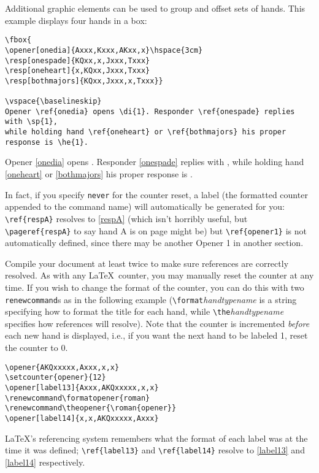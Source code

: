 \documentclass[10pt]{article}%
\newcommand{\gap}{\vspace{\baselineskip}}
\begin{document}
Additional graphic elements can be used to group and offset sets of hands. This example displays four hands in a box:

\begin{verbatim}
\fbox{
\opener[onedia]{Axxx,Kxxx,AKxx,x}\hspace{3cm}
\resp[onespade]{KQxx,x,Jxxx,Txxx}
\resp[oneheart]{x,KQxx,Jxxx,Txxx}
\resp[bothmajors]{KQxx,Jxxx,x,Txxx}}

\vspace{\baselineskip}
Opener \ref{onedia} opens \di{1}. Responder \ref{onespade} replies with \sp{1}, 
while holding hand \ref{oneheart} or \ref{bothmajors} his proper response is \he{1}.
\end{verbatim}


\gap Opener \ref{onedia} opens . Responder \ref{onespade} replies with , while holding hand \ref{oneheart} or \ref{bothmajors} his proper response is .

\gap In fact, if you specify \verb+never+ for the counter reset, a label (the formatted counter appended to the command name) will automatically be generated for you: \verb+\ref{respA}+ resolves to \ref{respA} (which isn't horribly useful, but \verb+\pageref{respA}+ to say hand A is on page \pageref{respA} might be) but \verb+\ref{opener1}+ is not automatically defined, since there may be another Opener 1 in another section.

Compile your document at least twice to make sure references are correctly resolved. As with any \LaTeX\ counter, you may manually reset the counter at any time. If you wish to change the format of the counter, you can do this with two \verb+renewcommand+s as in the following example (\verb+\format+\textit{handtypename} is a string specifying how to format the title for each hand, while \verb+\the+\textit{handtypename} specifies how references will resolve). Note that the counter is incremented \textit{before} each new hand is displayed, i.e., if you want the next hand to be labeled 1, reset the counter to 0.


\begin{verbatim}
\opener{AKQxxxxx,Axxx,x,x}
\setcounter{opener}{12}
\opener[label13]{Axxx,AKQxxxxx,x,x}
\renewcommand\formatopener{roman}
\renewcommand\theopener{\roman{opener}}
\opener[label14]{x,x,AKQxxxxx,Axxx}
\end{verbatim}


\setcounter{opener}{12}
\renewcommand\formatopener{roman}
\renewcommand\theopener{\roman{opener}}

\gap
\LaTeX 's referencing system remembers  what the format of each label was at the time it was defined; \verb+\ref{label13}+ and \verb+\ref{label14}+ resolve to \ref{label13} and \ref{label14} respectively.
\end{document}

